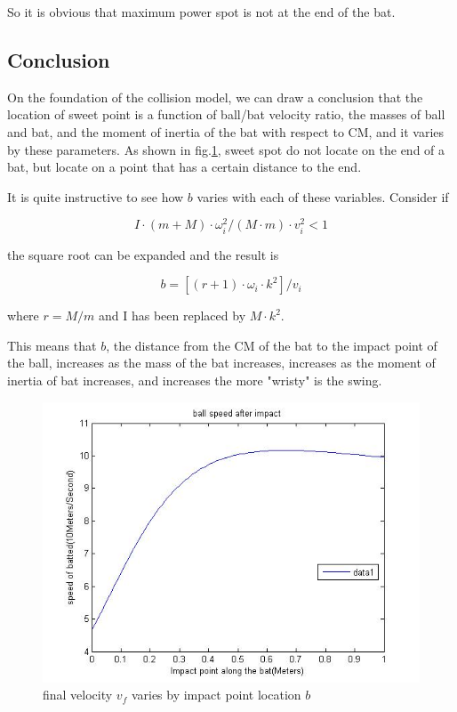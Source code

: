 \documentclass[12pt]{article}
\begin{document}
So it is obvious that maximum power spot is not at the end of the bat.




\subsection{Conclusion}
On the foundation of the collision model, we can draw a conclusion that the location of sweet point
is a function of ball/bat velocity ratio, the masses of ball and bat, and the moment of inertia of the bat
with respect to CM, and it varies by these parameters. As shown in fig.\ref{fig:maximum}, sweet spot
do not locate on the end of a bat, but locate on a point that has a certain distance to the end.

It is quite instructive to see how $b$ varies with each of these variables.
Consider if

$$I\cdot (m+M)\cdot \omega_i^2/(M\cdot m)\cdot v_i^2<1$$

the square root can be expanded and the result is

$$b=[(r+1)\cdot \omega_i\cdot k^2]/v_i$$

where $r=M/m$ and I has been replaced by $M\cdot k^2$.

This means that $b$, the distance from the CM of the bat to the impact point of the ball, increases as the
mass of the bat increases, increases as the moment of inertia of bat increases, and increases the more "wristy"
is the swing.

\begin{center}
\begin{figure}[htpb]
\centering
\includegraphics[scale=0.6]{firstwen}
\caption{final velocity $v_f$ varies by impact point location $b$}\label{fig:maximum}
\end{figure}
\end{center}
\end{document}
